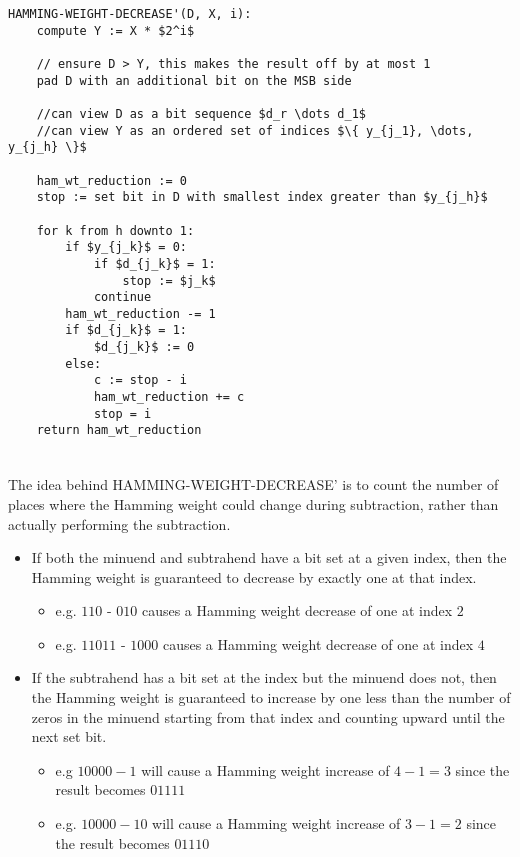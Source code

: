 \begin{lstlisting}[mathescape=true]
HAMMING-WEIGHT-DECREASE'(D, X, i):
    compute Y := X * $2^i$
    
    // ensure D > Y, this makes the result off by at most 1
    pad D with an additional bit on the MSB side
    
    //can view D as a bit sequence $d_r \dots d_1$
    //can view Y as an ordered set of indices $\{ y_{j_1}, \dots, y_{j_h} \}$
    
    ham_wt_reduction := 0
    stop := set bit in D with smallest index greater than $y_{j_h}$
    
    for k from h downto 1:
        if $y_{j_k}$ = 0:
            if $d_{j_k}$ = 1:
                stop := $j_k$
            continue
        ham_wt_reduction -= 1
        if $d_{j_k}$ = 1:
            $d_{j_k}$ := 0
        else:
            c := stop - i
            ham_wt_reduction += c
            stop = i
    return ham_wt_reduction
        
\end{lstlisting}

\paragraph{}
The idea behind HAMMING-WEIGHT-DECREASE' is to count the number of places where the Hamming weight could change during subtraction, rather than actually performing the subtraction.
\begin{itemize}
    \item If both the minuend and subtrahend have a bit set at a given index, then the Hamming weight is guaranteed to decrease by exactly one at that index.
    \begin{itemize}
        \item e.g. $110$ - $010$ causes a Hamming weight decrease of one at index $2$
        \item e.g. $11011$ - $1000$ causes a Hamming weight decrease of one at index $4$
    \end{itemize}
    \item If the subtrahend has a bit set at the index but the minuend does not, then the Hamming weight is guaranteed to increase by one less than the number of zeros in the minuend starting from that index and counting upward until the next set bit.
    \begin{itemize}
        \item e.g $10000 - 1$ will cause a Hamming weight increase of $4 - 1 = 3$ since the result becomes $01111$
        \item e.g. $10000 - 10$ will cause a Hamming weight increase of $3 - 1 = 2$ since the result becomes $01110$
    \end{itemize}
\end{itemize}

